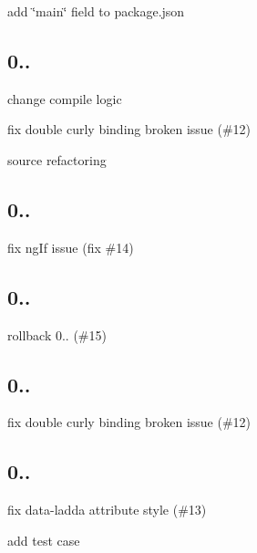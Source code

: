 \begin{DoxyItemize}
\item add \char`\"{}main\char`\"{} field to package.\+json
\end{DoxyItemize}

\subsection*{0..}


\begin{DoxyItemize}
\item change compile logic
\item fix double curly binding broken issue (\#12)
\item source refactoring
\end{DoxyItemize}

\subsection*{0..}


\begin{DoxyItemize}
\item fix ng\+If issue (fix \#14)
\end{DoxyItemize}

\subsection*{0..}


\begin{DoxyItemize}
\item rollback 0.. (\#15)
\end{DoxyItemize}

\subsection*{0..}


\begin{DoxyItemize}
\item fix double curly binding broken issue (\#12)
\end{DoxyItemize}

\subsection*{0..}


\begin{DoxyItemize}
\item fix data-\/ladda attribute style (\#13)
\item add test case
\end{DoxyItemize}

